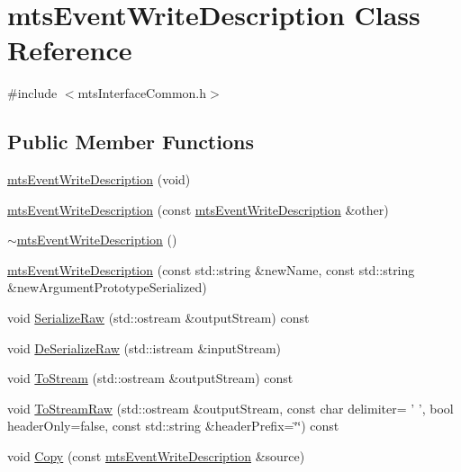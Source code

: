 \hypertarget{classmts_event_write_description}{\section{mts\-Event\-Write\-Description Class Reference}
\label{classmts_event_write_description}
}


{\ttfamily \#include $<$mts\-Interface\-Common.\-h$>$}

\subsection*{Public Member Functions}
\begin{DoxyCompactItemize}
\item 
\hyperlink{classmts_event_write_description_afb89c432bdb881025f980a2651ec53ba}{mts\-Event\-Write\-Description} (void)
\item 
\hyperlink{classmts_event_write_description_a3afd3122cd5913a0c1b063b89b9f766e}{mts\-Event\-Write\-Description} (const \hyperlink{classmts_event_write_description}{mts\-Event\-Write\-Description} \&other)
\item 
\hyperlink{classmts_event_write_description_a24a2677653fcc90e97a5f694804f8925}{$\sim$mts\-Event\-Write\-Description} ()
\item 
\hyperlink{classmts_event_write_description_a7875c6c14b753057ff8570f194bf4884}{mts\-Event\-Write\-Description} (const std\-::string \&new\-Name, const std\-::string \&new\-Argument\-Prototype\-Serialized)
\item 
void \hyperlink{classmts_event_write_description_ab026bd26ff75c7db87b6dc2a2b7b01fa}{Serialize\-Raw} (std\-::ostream \&output\-Stream) const 
\item 
void \hyperlink{classmts_event_write_description_a21f614b0a8657771b6240edb7cac40c4}{De\-Serialize\-Raw} (std\-::istream \&input\-Stream)
\item 
void \hyperlink{classmts_event_write_description_adf6aa527fc192f04e57e88e3a328f7fe}{To\-Stream} (std\-::ostream \&output\-Stream) const 
\item 
void \hyperlink{classmts_event_write_description_a7d673b2ed51d07b597a50d2f6c8a1bfc}{To\-Stream\-Raw} (std\-::ostream \&output\-Stream, const char delimiter= ' ', bool header\-Only=false, const std\-::string \&header\-Prefix=\char`\"{}\char`\"{}) const 
\item 
void \hyperlink{classmts_event_write_description_a8e24b958a99dc75fceb4c8d6213da890}{Copy} (const \hyperlink{classmts_event_write_description}{mts\-Event\-Write\-Description} \&source)

\end{DoxyCompactItemize}

